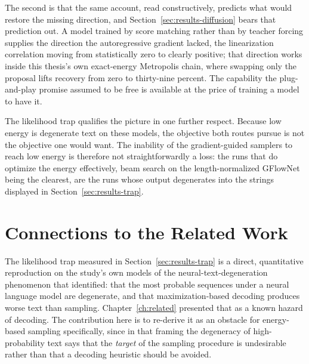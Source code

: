 The second is that the same account, read constructively, predicts what would restore the missing direction, and Section~\ref{sec:results-diffusion} bears that prediction out. A model trained by score matching rather than by teacher forcing supplies the direction the autoregressive gradient lacked, the linearization correlation moving from statistically zero to clearly positive; that direction works inside this thesis's own exact-energy Metropolis chain, where swapping only the proposal lifts recovery from zero to thirty-nine percent. The capability the plug-and-play promise assumed to be free is available at the price of training a model to have it.

The likelihood trap qualifies the picture in one further respect. Because low energy is degenerate text on these models, the objective both routes pursue is not the objective one would want. The inability of the gradient-guided samplers to reach low energy is therefore not straightforwardly a loss: the runs that do optimize the energy effectively, beam search on the length-normalized GFlowNet being the clearest, are the runs whose output degenerates into the strings displayed in Section~\ref{sec:results-trap}.

\section{Connections to the Related Work}
\label{sec:disc-related}

The likelihood trap measured in Section~\ref{sec:results-trap} is a direct, quantitative reproduction on the study's own models of the neural-text-degeneration phenomenon that \citet{holtzman2020curious} identified: that the most probable sequences under a neural language model are degenerate, and that maximization-based decoding produces worse text than sampling. Chapter~\ref{ch:related} presented that as a known hazard of decoding. The contribution here is to re-derive it as an obstacle for energy-based sampling specifically, since in that framing the degeneracy of high-probability text says that the \emph{target} of the sampling procedure is undesirable rather than that a decoding heuristic should be avoided.

